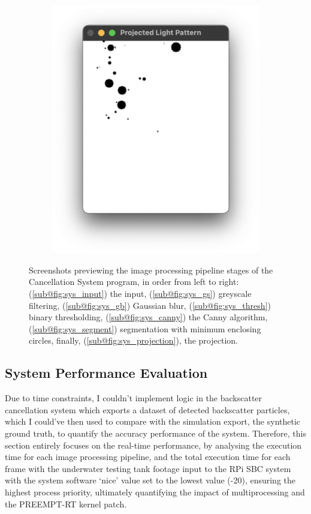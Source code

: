 \begin{figure}[H]
\begin{subfigure}{.39\textwidth}
        \includegraphics[width=1\linewidth]{assets/sys_project.png}
        \caption{}
        \label{fig:sys_projection}
    \end{subfigure}
    \caption{Screenshots previewing the image processing pipeline stages of the Cancellation System program, in order from left to right: (\ref{sub@fig:sys_input}) the input, (\ref{sub@fig:sys_gs}) greyscale filtering, (\ref{sub@fig:sys_gb}) Gaussian blur, (\ref{sub@fig:sys_thresh}) binary thresholding, (\ref{sub@fig:sys_canny}) the Canny algorithm, (\ref{sub@fig:sys_segment}) segmentation with minimum enclosing circles, finally, (\ref{sub@fig:sys_projection}), the projection.}
    \label{fig:sys_flow_visual}
\end{figure}

\subsection{System Performance Evaluation}

Due to time constraints, I couldn't implement logic in the backscatter cancellation system which exports a dataset of detected backscatter particles, which I could've then used to compare with the simulation export, the synthetic ground truth, to quantify the accuracy performance of the system. Therefore, this section entirely focuses on the real-time performance, by analysing the execution time for each image processing pipeline, and the total execution time for each frame with the underwater testing tank footage input to the RPi SBC system with the system software `nice' value set to the lowest value (-20), ensuring the highest process priority, ultimately quantifying the impact of multiprocessing and the PREEMPT-RT kernel patch.

